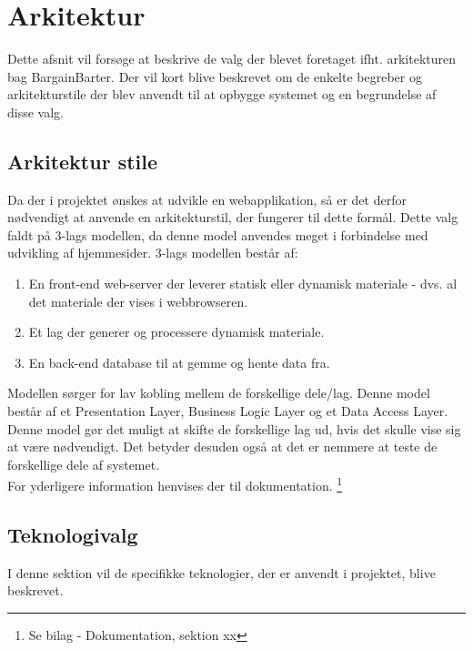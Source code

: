 \chapter{Arkitektur}
Dette afsnit vil forsøge at beskrive de valg der blevet foretaget ifht. arkitekturen bag BargainBarter. Der vil kort blive beskrevet om de enkelte begreber og arkitekturstile der blev anvendt til at opbygge systemet og en begrundelse af disse valg.

\section{Arkitektur stile}
Da der i projektet ønskes at udvikle en webapplikation, så er det derfor nødvendigt at anvende en arkitekturstil, der fungerer til dette formål. 
Dette valg faldt på 3-lags modellen, da denne model anvendes meget i forbindelse med udvikling af hjemmesider. 3-lags modellen består af:
\begin{enumerate}
	\item En front-end web-server der leverer statisk eller dynamisk materiale - dvs. al det materiale der vises i webbrowseren.
	\item Et lag der generer og processere  dynamisk materiale.
	\item En back-end database til at gemme og hente data fra.
\end{enumerate}

Modellen sørger for lav kobling mellem de forskellige dele/lag. Denne model består af et Presentation Layer, Business Logic Layer og et Data Access Layer. Denne model gør det muligt at skifte de forskellige lag ud, hvis det skulle vise sig at være nødvendigt. Det betyder desuden også at det er nemmere at teste de forskellige dele af systemet. \\
For yderligere information henvises der til dokumentation. \footnote{Se bilag - Dokumentation, sektion xx}

\section{Teknologivalg}
I denne sektion vil de specifikke teknologier, der er anvendt i projektet, blive beskrevet.


